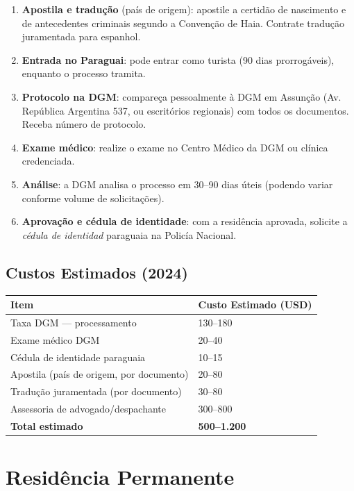 \begin{enumerate}
\item \textbf{Apostila e tradução} (país de origem): apostile a certidão de nascimento e de antecedentes criminais segundo a Convenção de Haia. Contrate tradução juramentada para espanhol.
\item \textbf{Entrada no Paraguai}: pode entrar como turista (90 dias prorrogáveis), enquanto o processo tramita.
\item \textbf{Protocolo na DGM}: compareça pessoalmente à DGM em Assunção (Av. República Argentina 537, ou escritórios regionais) com todos os documentos. Receba número de protocolo.
\item \textbf{Exame médico}: realize o exame no Centro Médico da DGM ou clínica credenciada.
\item \textbf{Análise}: a DGM analisa o processo em 30--90 dias úteis (podendo variar conforme volume de solicitações).
\item \textbf{Aprovação e cédula de identidade}: com a residência aprovada, solicite a \textit{cédula de identidad} paraguaia na Policía Nacional.
\end{enumerate}

\subsection*{Custos Estimados (2024)}

\begin{tabularx}{\linewidth}{lX}
\toprule
\textbf{Item} & \textbf{Custo Estimado (USD)} \\
\midrule
Taxa DGM --- processamento & 130--180 \\
Exame médico DGM & 20--40 \\
Cédula de identidade paraguaia & 10--15 \\
Apostila (país de origem, por documento) & 20--80 \\
Tradução juramentada (por documento) & 30--80 \\
Assessoria de advogado/despachante & 300--800 \\
\midrule
\textbf{Total estimado} & \textbf{500--1.200} \\
\bottomrule
\end{tabularx}

\section*{Residência Permanente}

